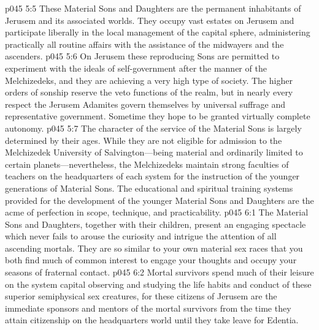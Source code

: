 \pc \vs p045 5:5 These Material Sons and Daughters are the permanent inhabitants of Jerusem and its associated worlds. They occupy vast estates on Jerusem and participate liberally in the local management of the capital sphere, administering practically all routine affairs with the assistance of the midwayers and the ascenders.
\vs p045 5:6 On Jerusem these reproducing Sons are permitted to experiment with the ideals of self\hyp{}government after the manner of the Melchizedeks, and they are achieving a very high type of society. The higher orders of sonship reserve the veto functions of the realm, but in nearly every respect the Jerusem Adamites govern themselves by universal suffrage and representative government. Sometime they hope to be granted virtually complete autonomy.\plusone
\vs p045 5:7 The character of the service of the Material Sons is largely determined by their ages. While they are not eligible for admission to the Melchizedek University of Salvington---being material and ordinarily limited to certain planets---nevertheless, the Melchizedeks maintain strong faculties of teachers on the headquarters of each system for the instruction of the younger generations of Material Sons. The educational and spiritual training systems provided for the development of the younger Material Sons and Daughters are the acme of perfection in scope, technique, and practicability.
\vs p045 6:1 The Material Sons and Daughters, together with their children, present an engaging spectacle which never fails to arouse the curiosity and intrigue the attention of all ascending mortals. They are so similar to your own material sex races that you both find much of common interest to engage your thoughts and occupy your seasons of fraternal contact.
\vs p045 6:2 Mortal survivors spend much of their leisure on the system capital observing and studying the life habits and conduct of these superior semiphysical sex creatures, for these citizens of Jerusem are the immediate sponsors and mentors of the mortal survivors from the time they attain citizenship on the headquarters world until they take leave for Edentia.

